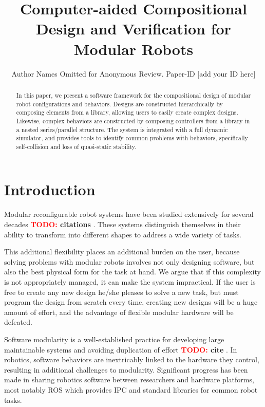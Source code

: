 \documentclass[conference]{IEEEtran}
\theoremstyle{definition}
\newcommand{\TODO}[1]{ {\bf \textcolor{red}{TODO:} #1 }}
\begin{document}
\title{Computer-aided Compositional Design and Verification for Modular Robots}

\author{Author Names Omitted for Anonymous Review. Paper-ID [add your ID here]}

\maketitle

\begin{abstract}
In this paper, we present a software framework for the compositional design of
modular robot configurations and behaviors. Designs are constructed
hierarchically by composing elements from a library, allowing users to easily
create complex designs.  Likewise, complex behaviors are constructed by
composing controllers from a library in a nested series/parallel structure. The
system is integrated with a full dynamic simulator, and provides tools to
identify common problems with behaviors, specifically self-collision and loss
of quasi-static stability.

\end{abstract}

\section{Introduction}
Modular reconfigurable robot systems have been studied extensively for several
decades \TODO{citations}.  These systems distinguish themselves in their
ability to transform into different shapes to address a wide variety of tasks.

This additional flexibility places an additional burden on the user, because
solving problems with modular robots involves not only designing  software,
but also the best physical form for the task at hand. We argue that if this
complexity is not appropriately managed, it can make the system
impractical. If the user is free to create any new design he/she pleases to
solve a new task, but must program the design from scratch every time, creating
new designs will be a huge amount of effort, and the advantage of flexible modular
hardware will be defeated.

Software modularity is a well-established practice for developing large
maintainable systems and avoiding duplication of effort \TODO{cite}. In robotics, software
behaviors are inextricably linked to the hardware they control, resulting in
additional challenges to modularity. Significant progress has been made in
sharing robotics software between researchers
and hardware platforms, most notably
ROS which provides IPC and standard libraries for common robot tasks. 
\end{document}
